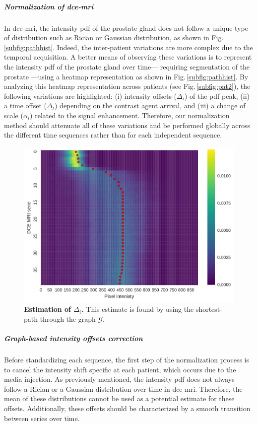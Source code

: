 \documentclass[final,3p,times,twocolumn]{elsarticle}
\begin{document}
\subparagraph{Normalization of \ac{dce}-\ac{mri}} In \ac{dce}-\ac{mri}, the
intensity \ac{pdf} of the prostate gland does not follow a unique type of
distribution such as Rician or Gaussian distribution, as shown in
Fig.\,\ref{subfig:pathhist}. Indeed, the inter-patient variations are more
complex due to the temporal acquisition. A better means of observing these
variations is to represent the intensity \ac{pdf} of the prostate gland over
time--- requiring segmentation of the prostate ---using a heatmap
representation as shown in Fig.\,\ref{subfig:pathhist}. By analyzing this
heatmap representation across patients (see Fig.\,\ref{subfig:pat2}), the
following variations are highlighted: (i) intensity offsets ($\Delta_i$) of the
\ac{pdf} peak, (ii) a time offset ($\Delta_t$) depending on the contrast agent
arrival, and (iii) a change of scale ($\alpha_i$) related to the signal
enhancement. Therefore, our normalization method should attenuate all of these
variations and be performed globally across the different time sequences rather
than for each independent sequence.

\begin{figure}
  \centering
  \includegraphics[width=0.8\linewidth]{images/DCE-normalization/estimator.pdf}
  \caption{\textbf{Estimation of $\Delta_i$.} This estimate is found by using
    the shortest-path through the graph $\mathcal{G}$.}
  \label{fig:estimator}
\end{figure}

\subparagraph{Graph-based intensity offsets correction} Before standardizing
each sequence, the first step of the normalization process is to cancel the
intensity shift specific at each patient, which occurs due to the media
injection. As previously mentioned, the intensity \ac{pdf} does not always
follow a Rician or a Gaussian distribution over time in
\ac{dce}-\ac{mri}. Therefore, the mean of these distributions cannot be used as
a potential estimate for these offsets. Additionally, these offsets should be
characterized by a smooth transition between series over time.
\end{document}
